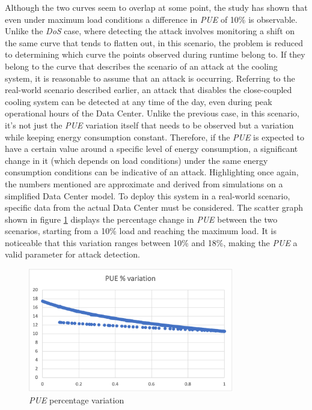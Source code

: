 Although the two curves seem to overlap at some point, the study has shown that even under maximum load conditions a difference in \emph{PUE} of 10\% is observable. Unlike the \emph{DoS} case, where detecting the attack involves monitoring a shift on the same curve that tends to flatten out, in this scenario, the problem is reduced to determining which curve the points observed during runtime belong to. If they belong to the curve that describes the scenario of an attack at the cooling system, it is reasonable to assume that an attack is occurring.
Referring to the real-world scenario described earlier, an attack that disables the close-coupled cooling system can be detected at any time of the day, even during peak operational hours of the Data Center. Unlike the previous case, in this scenario, it's not just the \emph{PUE} variation itself that needs to be observed but a variation while keeping energy consumption constant. Therefore, if the \emph{PUE} is expected to have a certain value around a specific level of energy consumption, a significant change in it (which depends on load conditions) under the same energy consumption conditions can be indicative of an attack. Highlighting once again, the numbers mentioned are approximate and derived from simulations on a simplified Data Center model. To deploy this system in a real-world scenario, specific data from the actual Data Center must be considered. The scatter graph shown in figure \ref{fig:pue_variation_cooling} displays the percentage change in \emph{PUE} between the two scenarios, starting from a 10\% load and reaching the maximum load. It is noticeable that this variation ranges between 10\% and 18\%, making the \emph{PUE} a valid parameter for attack detection.

\begin{figure}[h]
    \centering
    \includegraphics[width=0.8\textwidth]{chapters/images/pue_variation_cooling.png}
    \caption{\emph{PUE} percentage variation}
    \label{fig:pue_variation_cooling}
\end{figure}

